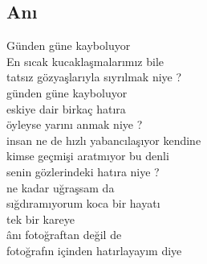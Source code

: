 \subsection{Anı}

Günden güne kayboluyor \\
En sıcak kucaklaşmalarımız bile \\
tatsız gözyaşlarıyla sıyrılmak niye ? \\

\noindent\newline
günden güne kayboluyor \\
eskiye dair birkaç hatıra \\
öyleyse yarını anmak niye ? \\

\noindent\newline
insan ne de hızlı yabancılaşıyor kendine \\
kimse geçmişi aratmıyor bu denli \\
senin gözlerindeki hatıra niye ? \\

\noindent\newline
ne kadar uğraşsam da \\
sığdıramıyorum koca bir hayatı \\
tek bir kareye \\
ânı fotoğraftan değil de \\
fotoğrafın içinden hatırlayayım diye \\